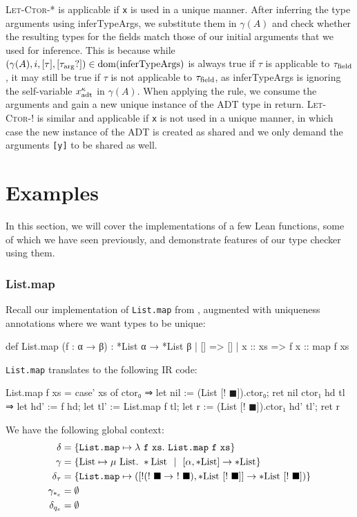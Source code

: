 \textsc{Let-Ctor-*} is applicable if \texttt{x} is used in a unique manner. After inferring the type arguments using inferTypeArgs, we substitute them in $\gamma(A)$ and check whether the resulting types for the fields match those of our initial arguments that we used for inference. This is because while $(\gamma(A), i, [\tau], [\tau_{\mathrm{arg}}?]) \in \mathrm{dom}(\mathrm{inferTypeArgs})$ is always true if $\tau$ is applicable to $\tau_{\mathrm{field}}$, it may still be true if $\tau$ is not applicable to $\tau_{\mathrm{field}}$, as inferTypeArgs is ignoring the self-variable $x_{\mathrm{adt}}^\kappa$ in $\gamma(A)$. When applying the rule, we consume the arguments and gain a new unique instance of the ADT type in return. \textsc{Let-Ctor-!} is similar and applicable if \texttt{x} is not used in a unique manner, in which case the new instance of the ADT is created as shared and we only demand the arguments \texttt{[y]} to be shared as well.

\section{Examples}\label{sec:examples}
In this section, we will cover the implementations of a few Lean functions, some of which we have seen previously, and demonstrate features of our type checker using them.

\subsubsection{List.map}
Recall our implementation of \lstinline|List.map| from , augmented with uniqueness annotations where we want types to be unique:\\
\begin{code}
def List.map (f : α → β) : *List α → *List β
  | []      => []
  | x :: xs => f x :: map f xs
\end{code}
\lstinline|List.map| translates to the following IR code:\\
\begin{ifcode}
List.map f xs = case' xs of
  ctor₀ ⇒
    let nil := (List [! $\blacksquare$]).ctor₀;
    ret nil
  ctor₁ hd tl ⇒
    let hd' := f hd;
    let tl' := List.map f tl;
    let r := (List [! $\blacksquare$]).ctor₁ hd' tl';
    ret r
\end{ifcode}

We have the following global context:
\begin{align*}
	\delta &= \{\texttt{List.map} \mapsto \lambda\ \texttt{f}\ \texttt{xs}.\ \texttt{List.map}\ \texttt{f}\ \texttt{xs}\} \\
	\gamma &= \{\List \mapsto \mu\ \List.\ *\List \sep [\alpha, *\List] \to *\List\} \\
	\delta_\tau &= \{\texttt{List.map} \mapsto ([!(!\ \blacksquare \to\ !\ \blacksquare), *\List\ [!\ \blacksquare]] \to *\List\ [!\ \blacksquare])\} \\
	\gamma_{*_e} &= \emptyset \\
	\delta_{q_e} &= \emptyset
\end{align*}

